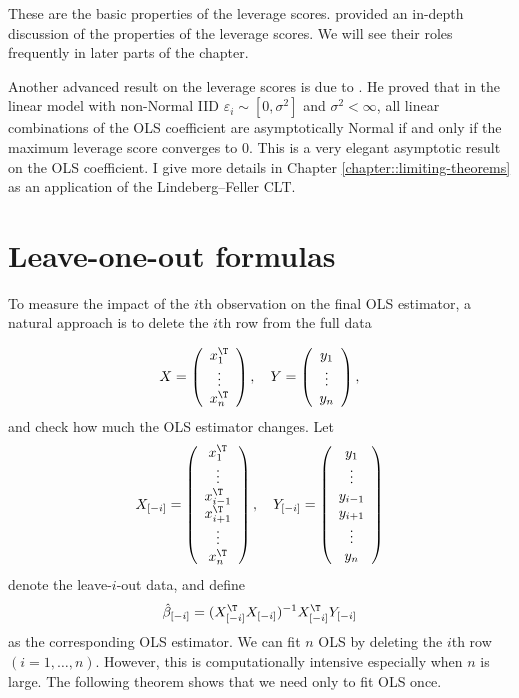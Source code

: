 These are the basic properties of the leverage scores. 
\citet{chatterjee1988sensitivity} provided an in-depth discussion of the properties of the leverage scores. 
We will see their roles frequently in later parts of the chapter.


Another advanced result on the leverage scores is due to 
\citet{huber1973robust}. He proved that in the linear model with non-Normal IID $\varepsilon_i \sim [0, \sigma^2 ]$ and $\sigma^2 < \infty$, all linear combinations of the OLS coefficient are asymptotically Normal if and only if the maximum leverage score converges to $0$. This is a very elegant asymptotic result on the OLS coefficient. I give more details in Chapter \ref{chapter::limiting-theorems} as an application of the Lindeberg--Feller CLT.  


 

\section{Leave-one-out formulas}

To measure the impact of the $i$th observation on the final OLS estimator,
a natural approach is to delete the $i$th row from the full data

\[
X=\left(\begin{array}{c}
x_{1}^{\T}\\
\vdots\\
x_{n}^{\T}
\end{array}\right),\quad Y=\left(\begin{array}{c}
y_{1}\\
\vdots\\
y_{n}
\end{array}\right),
\]
and check how much the OLS estimator changes. Let 
$$
X_{[-i]} = \left(\begin{array}{c}
x_{1}^{\T}\\
\vdots\\
x_{i-1}^{\T} \\
x_{i+1}^{\T} \\
\vdots\\
x_{n}^{\T}
\end{array}\right),\quad 
Y_{[-i]} = \left(\begin{array}{c}
y_{1}\\
\vdots\\
y_{i-1} \\
y_{i+1} \\
\vdots\\
y_{n}
\end{array}\right)
$$ 
denote the leave-$i$-out data, and define
\begin{equation}
\hat{\beta}_{[-i]}=(X_{[-i]}^{\T}X_{[-i]})^{-1}X_{[-i]}^{\T}Y_{[-i]}\label{eq:delete1ols}
\end{equation}
as the corresponding OLS estimator. We can fit $n$ OLS by deleting
the $i$th row $(i=1,\ldots,n)$. However, this is computationally
intensive especially when $n$ is large. The following theorem shows
that we need only to fit OLS once.


